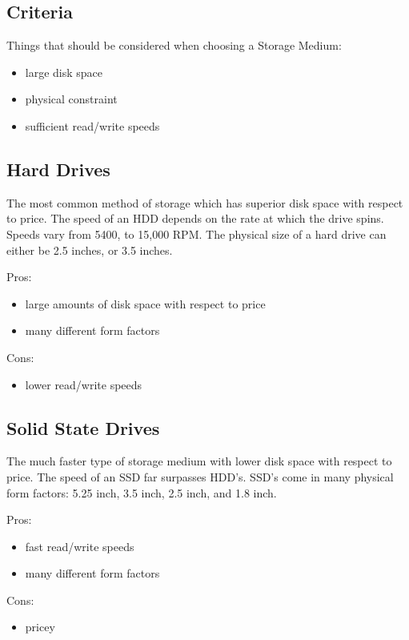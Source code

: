 \documentclass[onecolumn, draftclsnofoot,10pt, compsoc]{IEEEtran}
\begin{document}
\subsection{Criteria}
Things that should be considered when choosing a Storage Medium:

\begin{itemize}
    \item large disk space
    \item physical constraint
    \item sufficient read/write speeds
\end{itemize}

\subsection{Hard Drives}
The most common method of storage which has superior disk space with respect to price. The speed of an HDD depends on the rate at which the drive spins. Speeds vary from 5400, to 15,000 RPM. The physical size of a hard drive can either be 2.5 inches, or 3.5 inches. 
~\cite{storage:information}

Pros:
\begin{itemize}
    \item large amounts of disk space with respect to price
    \item many different form factors
\end{itemize}

Cons:
\begin{itemize}
    \item lower read/write speeds
\end{itemize}

\subsection{Solid State Drives}
The much faster type of storage medium with lower disk space with respect to price. The speed of an SSD far surpasses HDD's. SSD's come in many physical form factors: 5.25 inch, 3.5 inch, 2.5 inch, and 1.8 inch.
~\cite{storage:information}

Pros:
\begin{itemize}
    \item fast read/write speeds
    \item many different form factors
\end{itemize}

Cons:
\begin{itemize}
    \item pricey
\end{itemize}
\end{document}
